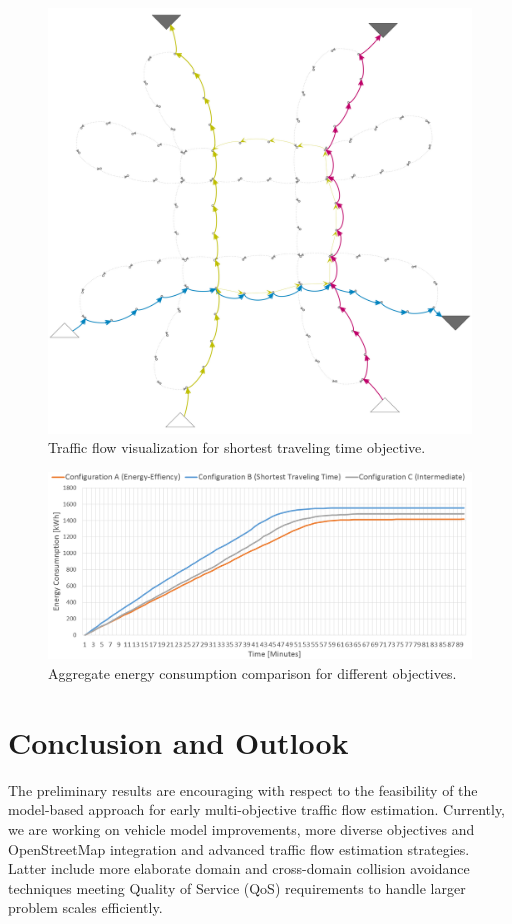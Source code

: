 \documentclass[conference]{../cls/IEEEtran}
\begin{document}
\begin{figure}[t!]
	\centering
	\includegraphics[width=0.925\columnwidth]{../gfx/graph.png}
	\caption{Traffic flow visualization for shortest traveling time objective.}
	\label{figure:graph}
\end{figure}

\begin{figure}[t!]
	\centering
	\includegraphics[width=0.925\columnwidth]{../gfx/chart.png}
	\caption{Aggregate energy consumption comparison for different objectives.}
	\label{figure:chart}
\end{figure}

\section{Conclusion and Outlook}

The preliminary results are encouraging with respect to the feasibility of the
model-based approach for early multi-objective traffic flow estimation.
Currently, we are working on vehicle model
improvements, more diverse objectives and OpenStreetMap integration and advanced
traffic flow estimation strategies. Latter include more elaborate domain and
cross-domain collision avoidance techniques meeting Quality of Service (QoS)
requirements to handle larger problem scales efficiently.




\end{document}

